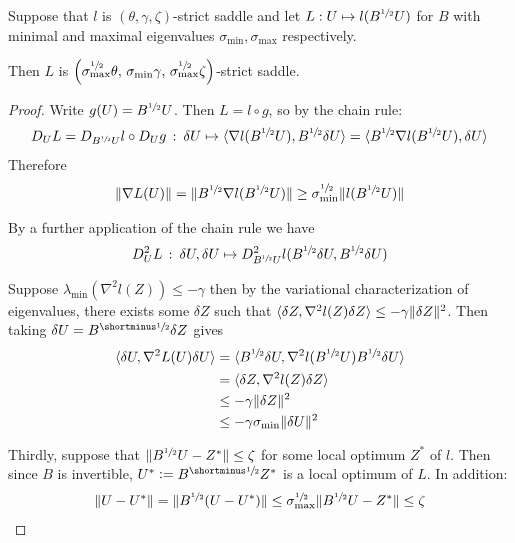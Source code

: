 \begin{lemma}\label{lem:strict-saddle-change-of-variables}
Suppose that $l$ is $(\theta, \gamma, \zeta)$-strict saddle and let $L: U \mapsto l(B^{\sfrac{1}{2}} U)$ for $B$ with minimal and maximal eigenvalues $\sigma_\text{min}, \sigma_\text{max}$ respectively.

Then $L$ is \(\left(\sigma_\text{max}^{\sfrac{1}{2}} \theta,\, \sigma_\text{min} \gamma,\, \sigma_\text{max}^{\sfrac{1}{2}} \zeta \right)\)-strict saddle.
\end{lemma}
\begin{proof}
    Write $g(U) = B^{\sfrac{1}{2}} U$. Then $L = l \circ g$, so by the chain rule:
    \begin{align*}
        D_U L = D_{B^{\sfrac{1}{2}} U} l \circ D_U g \, : \: \delta U \mapsto \langle \nabla l(B^{\sfrac{1}{2}} U), B^{{\sfrac{1}{2}}} \delta U \rangle
        = \langle B^{\sfrac{1}{2}} \nabla l(B^{\sfrac{1}{2}} U), \delta U \rangle
    \end{align*}
    Therefore
    \begin{align*}
        \lVert\nabla L(U)\rVert = \lVert B^{\sfrac{1}{2}} \nabla l(B^{\sfrac{1}{2}} U)\rVert \geq \sigma_\text{min}^{\sfrac{1}{2}} \lVert l(B^{\sfrac{1}{2}} U)\rVert
    \end{align*}

    By a further application of the chain rule we have
    \begin{align*}
        D_U^2 L \, : \: \delta U, \delta U \mapsto D^2_{B^{\sfrac{1}{2}} U} l(B^{\sfrac{1}{2}} \delta U, B^{\sfrac{1}{2}} \delta U)
    \end{align*}

    Suppose $\lambda_{\text{min}}(\nabla^2 l(Z)) \leq - \gamma$ then by the variational characterization of eigenvalues, there exists some $\delta Z$ such that $\langle \delta Z, \nabla^2 l(Z) \delta Z \rangle \leq - \gamma \lVert\delta Z\rVert^2$.
    Then taking $\delta U = B^\mhalf \delta Z$ gives
    \begin{align*}
        \langle \delta U, \nabla^2 L(U) \delta U \rangle
        &= \langle B^{\sfrac{1}{2}} \delta U, \nabla^2 l(B^{\sfrac{1}{2}} U) B^{\sfrac{1}{2}} \delta U \rangle \\
        &= \langle \delta Z, \nabla^2 l(Z) \delta Z \rangle  \\
        &\leq - \gamma \lVert\delta Z\rVert^2 \\
        & \leq - \gamma \sigma_{\text{min}} \lVert\delta U\rVert^2
    \end{align*}

    Thirdly, suppose that $\lVert B^{\sfrac{1}{2}} U - Z^*\rVert \leq \zeta$ for some local optimum $Z^*$ of $l$. Then since $B$ is invertible, $U^* \defeq B^\mhalf Z^*$ is a local optimum of $L$. In addition:
    \begin{align*}
        \lVert U - U^*\rVert = \lVert B^{\sfrac{1}{2}}( U - U^*)\rVert \leq \sigma_\text{max}^{\sfrac{1}{2}} \lVert B^{\sfrac{1}{2}} U - Z^*\rVert \leq \zeta
    \end{align*}


\end{proof}
